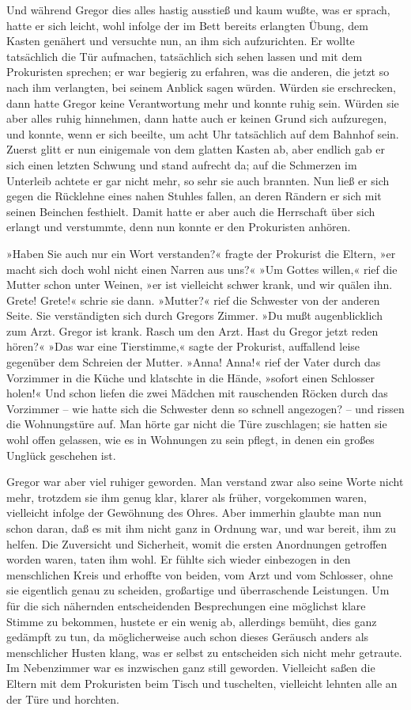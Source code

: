 Und während Gregor dies alles hastig ausstieß und kaum wußte, was er
sprach, hatte er sich leicht, wohl infolge der im Bett bereits erlangten
Übung, dem Kasten genähert und versuchte nun, an ihm sich aufzurichten.
Er wollte tatsächlich die Tür aufmachen, tatsächlich sich sehen lassen
und mit dem Prokuristen sprechen; er war begierig zu erfahren, was die
anderen, die jetzt so nach ihm verlangten, bei seinem Anblick sagen
würden. Würden sie erschrecken, dann hatte Gregor keine Verantwortung
mehr und konnte ruhig sein. Würden sie aber alles ruhig hinnehmen, dann
hatte auch er keinen Grund sich aufzuregen, und konnte, wenn er sich
beeilte, um acht Uhr tatsächlich auf dem Bahnhof sein. Zuerst glitt er
nun einigemale von dem glatten Kasten ab, aber endlich gab er sich
einen letzten Schwung und stand aufrecht da; auf die Schmerzen im
Unterleib achtete er gar nicht mehr, so sehr sie auch brannten. Nun ließ
er sich gegen die Rücklehne eines nahen Stuhles fallen, an deren Rändern
er sich mit seinen Beinchen festhielt. Damit hatte er aber auch die
Herrschaft über sich erlangt und verstummte, denn nun konnte er den
Prokuristen anhören.

»Haben Sie auch nur ein Wort verstanden?« fragte der Prokurist die
Eltern, »er macht sich doch wohl nicht einen Narren aus uns?« »Um Gottes
willen,« rief die Mutter schon unter Weinen, »er ist vielleicht schwer
krank, und wir quälen ihn. Grete! Grete!« schrie sie dann. »Mutter?«
rief die Schwester von der anderen Seite. Sie verständigten sich durch
Gregors Zimmer. »Du mußt augenblicklich zum Arzt. Gregor ist krank.
Rasch um den Arzt. Hast du Gregor jetzt reden hören?« »Das war eine
Tierstimme,« sagte der Prokurist, auffallend leise gegenüber dem
Schreien der Mutter. »Anna! Anna!« rief der Vater durch das Vorzimmer in
die Küche und klatschte in die Hände, »sofort einen Schlosser holen!«
Und schon liefen die zwei Mädchen mit rauschenden Röcken durch das
Vorzimmer -- wie hatte sich die Schwester denn so schnell angezogen? --
und rissen die Wohnungstüre auf. Man hörte gar nicht die Türe
zuschlagen; sie hatten sie wohl offen gelassen, wie es in Wohnungen zu
sein pflegt, in denen ein großes Unglück geschehen ist.

Gregor war aber viel ruhiger geworden. Man verstand zwar also seine
Worte nicht mehr, trotzdem sie ihm genug klar, klarer als früher,
vorgekommen waren, vielleicht infolge der Gewöhnung des Ohres. Aber
immerhin glaubte man nun schon daran, daß es mit ihm nicht ganz in
Ordnung war, und war bereit, ihm zu helfen. Die Zuversicht und
Sicherheit, womit die ersten Anordnungen getroffen worden waren, taten
ihm wohl. Er fühlte sich wieder einbezogen in den menschlichen Kreis und
erhoffte von beiden, vom Arzt und vom Schlosser, ohne sie eigentlich
genau zu scheiden, großartige und überraschende Leistungen. Um für die
sich nähernden entscheidenden Besprechungen eine möglichst klare Stimme
zu bekommen, hustete er ein wenig ab, allerdings bemüht, dies ganz
gedämpft zu tun, da möglicherweise auch schon dieses Geräusch anders als
menschlicher Husten klang, was er selbst zu entscheiden sich nicht mehr
getraute. Im Nebenzimmer war es inzwischen ganz still geworden.
Vielleicht saßen die Eltern mit dem Prokuristen beim Tisch und
tuschelten, vielleicht lehnten alle an der Türe und horchten.

